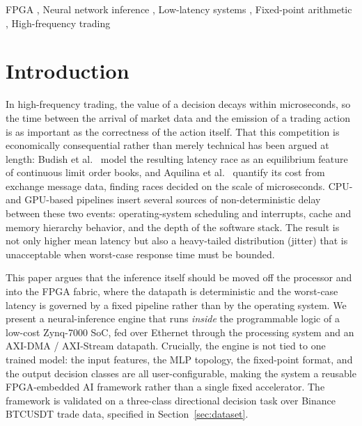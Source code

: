 \documentclass[final,5p,times,twocolumn]{elsarticle}
\begin{document}
\begin{frontmatter}
\begin{keyword}
FPGA \sep
Neural network inference \sep
Low-latency systems \sep
Fixed-point arithmetic \sep
High-frequency trading
\end{keyword}

\end{frontmatter}

\section{Introduction}
In high-frequency trading, the value of a decision decays within microseconds,
so the time between the arrival of market data and the emission of a trading
action is as important as the correctness of the action itself. That this
competition is economically consequential rather than merely technical has been
argued at length: Budish et al.~\cite{Budish2015} model the resulting
latency race as an equilibrium feature of continuous limit order books, and
Aquilina et al.~\cite{Aquilina2022} quantify its cost from exchange message
data, finding races decided on the scale of microseconds. CPU- and
GPU-based pipelines insert several sources of non-deterministic delay between
these two events: operating-system scheduling and interrupts, cache and memory
hierarchy behavior, and the depth of the software stack. The result is not
only higher mean latency but also a heavy-tailed distribution (jitter) that is
unacceptable when worst-case response time must be bounded.

This paper argues that the inference itself should be moved off the processor
and into the FPGA fabric, where the datapath is deterministic and the
worst-case latency is governed by a fixed pipeline rather than by the operating
system. We present a neural-inference engine that runs \emph{inside} the
programmable logic of a low-cost Zynq-7000 SoC, fed over Ethernet through the
processing system and an AXI-DMA / AXI-Stream datapath. Crucially, the engine
is not tied to one trained model: the input features, the MLP topology, the
fixed-point format, and the output decision classes are all user-configurable,
making the system a reusable FPGA-embedded AI framework rather than a single
fixed accelerator. The framework is validated on a three-class directional
decision task over Binance BTCUSDT trade data, specified in
Section~\ref{sec:dataset}.
\end{document}
